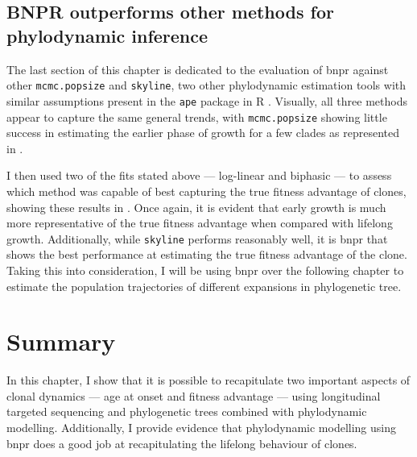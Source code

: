 \subsection{BNPR outperforms other methods for phylodynamic inference}

The last section of this chapter is dedicated to the evaluation of \ac{bnpr} against other \texttt{mcmc.popsize} and \texttt{skyline}, two other phylodynamic estimation tools with similar assumptions present in the \texttt{ape} package in R \cite{Paradis2019-na}. Visually, all three methods appear to capture the same general trends, with \texttt{mcmc.popsize} showing little success in estimating the earlier phase of growth for a few clades as represented in .

\begin{figure}[!ht]
	\label{fig:compare-phylo-traj}
\end{figure}

I then used two of the fits stated above --- log-linear and biphasic --- to assess which method was capable of best capturing the true fitness advantage of clones, showing these results in . Once again, it is evident that early growth is much more representative of the true fitness advantage when compared with lifelong growth. Additionally, while \texttt{skyline} performs reasonably well, it is \ac{bnpr} that shows the best performance at estimating the true fitness advantage of the clone. Taking this into consideration, I will be using \ac{bnpr} over the following chapter to estimate the population trajectories of different expansions in phylogenetic tree.

\begin{figure}[!ht]
	\label{fig:compare-phylo-traj-heatmap}
\end{figure}

\section{Summary}

In this chapter, I show that it is possible to recapitulate two important aspects of clonal dynamics --- age at onset and fitness advantage --- using longitudinal targeted sequencing and phylogenetic trees combined with phylodynamic modelling. Additionally, I provide evidence that phylodynamic modelling using \ac{bnpr} does a good job at recapitulating the lifelong behaviour of clones.

